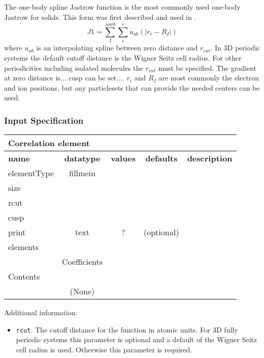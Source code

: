 The one-body spline Jastrow function is the most commonly used one-body Jastrow for solids. This form was first described and used in \cite{spline_jastrow_citation_where_is_it_from}. 
\begin{equation}
J1=\sum_I^{ion0}\sum_i^e u_{ab}(|r_r-R_I|)
\end{equation}
where $u_{ab}$ is an interpolating spline between zero distance and $r_{cut}$. In 3D periodic systems the default cutoff distance is the Wigner Seitz cell radius. For other periodicities including isolated molecules the $r_{cut}$ must be specified. The gradient at zero distance is...  cusp can be set....  $r_i$ and $R_I$ are most commonly the electron and ion positions, but any particlesets that can 
provide the needed centers can be used.

\subsubsection{Input Specification}
\begin{table}[h]
\begin{center}
\begin{tabular}{l c c c l }
\hline
\multicolumn{5}{l}{Correlation element} \\
\hline
\bfseries name & \bfseries datatype & \bfseries values & \bfseries defaults & \bfseries description \\
\hline
elementType & fillmein  & &  & \\
size &  & &  & \\
rcut &  & &  & \\
cusp&   & &  & \\
print & text & ? & (optional) &  \\
\hline
\multicolumn{5}{l}{elements}\\ \hline
& Coefficients & & & \\ \hline
\multicolumn{5}{l}{Contents}\\ \hline
& (None)  & & &  \\ \hline
\end{tabular}
\end{center}
\end{table}

Additional information:

 \begin{itemize}
 \item \texttt{rcut}. The cutoff distance for the function in atomic units. For 3D fully periodic systems this parameter is optional and a default of the Wigner Seitz cell radius is used. Otherwise this parameter is required.
 \end{itemize}

